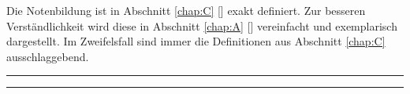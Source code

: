 \documentclass{article}
\begin{document}
	\vspace*{-1cm}
	Die Notenbildung ist in Abschnitt \ref{chap:C} [] exakt definiert. Zur besseren Verständlichkeit wird diese in Abschnitt \ref{chap:A} [] vereinfacht und exemplarisch dargestellt. Im Zweifelsfall sind immer die Definitionen aus Abschnitt \ref{chap:C} ausschlaggebend. 
		
	\rule{\linewidth}{2pt}
	\renewcommand{\contentsname}{Abschnitte der Notentransparenz}
	\tableofcontents
	\rule{\linewidth}{2pt}
	
	
	
	\vspace{1cm}

	

	\clearpage
	
\end{document}
